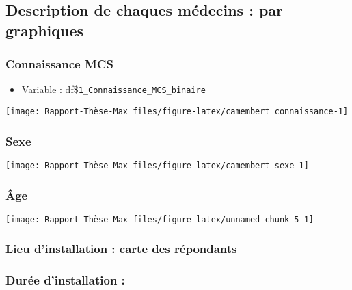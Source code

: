 \documentclass[
]{article}
\providecommand{\tightlist}{%
  \setlength{\itemsep}{0pt}\setlength{\parskip}{0pt}}
\begin{document}
\subsection{Description de chaques médecins : par
graphiques}\label{description-de-chaques-muxe9decins-par-graphiques}

\subsubsection{Connaissance MCS}\label{connaissance-mcs}

\begin{itemize}
\tightlist
\item
  Variable : df\$\texttt{1\_Connaissance\_MCS\_binaire}
\end{itemize}

\begin{center}\texttt{[image: Rapport-Thèse-Max\_files/figure-latex/camembert connaissance-1]} \end{center}

\subsubsection{Sexe}\label{sexe}

\begin{center}\texttt{[image: Rapport-Thèse-Max\_files/figure-latex/camembert sexe-1]} \end{center}

\subsubsection{Âge}\label{uxe2ge}

\begin{center}\texttt{[image: Rapport-Thèse-Max\_files/figure-latex/unnamed-chunk-5-1]} \end{center}

\subsubsection{Lieu d'installation : carte des
répondants}\label{lieu-dinstallation-carte-des-ruxe9pondants}

\subsubsection{Durée d'installation :}\label{duruxe9e-dinstallation}
\end{document}
